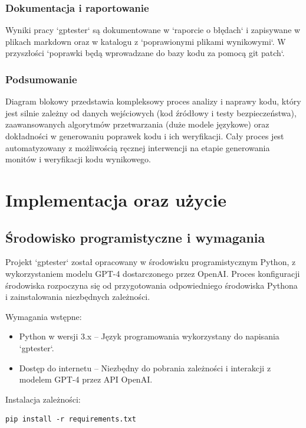 \subsubsection{Dokumentacja i raportowanie}
Wyniki pracy `gptester` są dokumentowane w `raporcie o błędach` i zapisywane w plikach markdown oraz w katalogu z `poprawionymi plikami wynikowymi`. W przyszłości `poprawki będą wprowadzane do bazy kodu za pomocą git patch`.

\subsubsection{Podsumowanie}
Diagram blokowy przedstawia kompleksowy proces analizy i naprawy kodu, który jest silnie zależny od danych wejściowych (kod źródłowy i testy bezpieczeństwa), zaawansowanych algorytmów przetwarzania (duże modele językowe) oraz dokładności w generowaniu poprawek kodu i ich weryfikacji. Cały proces jest automatyzowany z możliwością ręcznej interwencji na etapie generowania monitów i weryfikacji kodu wynikowego.


\section{Implementacja oraz użycie}
\subsection{Środowisko programistyczne i wymagania}
\label{sec:srodowisko_i_wymagania}

Projekt `gptester` został opracowany w środowisku programistycznym Python, z wykorzystaniem modelu GPT-4 dostarczonego przez OpenAI. Proces konfiguracji środowiska rozpoczyna się od przygotowania odpowiedniego środowiska Pythona i zainstalowania niezbędnych zależności.

Wymagania wstępne:
\begin{itemize}
    \item Python w wersji 3.x – Język programowania wykorzystany do napisania `gptester`.
    \item Dostęp do internetu – Niezbędny do pobrania zależności i interakcji z modelem GPT-4 przez API OpenAI.
\end{itemize}

Instalacja zależności:
\begin{listing}
    \begin{verbatim}
pip install -r requirements.txt
\end{verbatim}
\end{listing}

